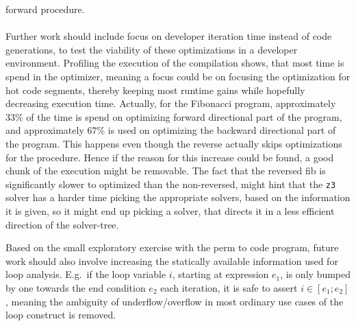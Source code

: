 forward procedure.
\\
\\
Further work should include focus on developer iteration time instead of code generations,
to test the viability of these optimizations in a developer environment. Profiling the execution
of the compilation shows, that most time is spend in the optimizer, meaning a focus could be
on focusing the optimization for hot code segments, thereby keeping most runtime gains while
hopefully decreasing execution time. Actually, for the Fibonacci program, approximately
$33\%$ of the time is spend on optimizing forward directional part of the program, and
approximately $67\%$ is used on optimizing the backward directional part of the program.
This happens even though the reverse actually skips optimizations for the 
procedure. Hence if the reason for this increase could be found, a good chunk of the
execution might be removable. The fact that the reversed fib is significantly slower
to optimized than the non-reversed, might hint that the \texttt{z3} solver has a harder
time picking the appropriate solvers, based on the information it is given, so it might
end up picking a solver, that directs it in a less efficient direction of the solver-tree.

Based on the small exploratory exercise with the perm to code program, future work should also
involve increasing the statically available information used for loop analysis. E.g.\ if
the loop variable $i$, starting at expression $e_1$, is only bumped by one towards the end
condition $e_2$ each iteration, it is safe to assert $i \in [e_1; e_2]$, meaning the ambiguity
of underflow/overflow in most ordinary use cases of the loop construct is removed.


